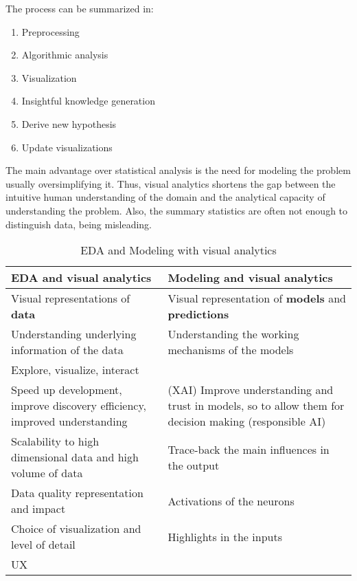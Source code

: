 \documentclass[a4paper]{report}
\begin{document}
The process can be summarized in:
\begin{enumerate}
    \item Preprocessing
    \item Algorithmic analysis
    \item Visualization
    \item Insightful knowledge generation
    \item Derive new hypothesis
    \item Update visualizations
\end{enumerate}

\begin{note}
    The main advantage over statistical analysis is the need for modeling the problem usually oversimplifying it. Thus, visual analytics shortens the gap between the intuitive human understanding of the domain and the analytical capacity of understanding the problem. Also, the summary statistics are often not enough to distinguish data, being misleading.
\end{note}

\begin{table}[H]
    \centering
    \caption{EDA and Modeling with visual analytics}
    \label{tab:eda-modeling}
    \begin{tabularx}{\textwidth}{X X}
    \toprule
    EDA and visual analytics & Modeling and visual analytics \\
    \midrule
    Visual representations of \textbf{data} & Visual representation of \textbf{models} and \textbf{predictions} \\
    Understanding underlying information of the data & Understanding the working mechanisms of the models \\
    Explore, visualize, interact & \\
    \midrule
    Speed up development, improve discovery efficiency, improved understanding & (XAI) Improve understanding and trust in models, so to allow them for decision making (responsible AI) \\
    \midrule
    Scalability to high dimensional data and high volume of data & Trace-back the main influences in the output \\
    Data quality representation and impact & Activations of the neurons \\
    Choice of visualization and level of detail & Highlights in the inputs \\
    UX & \\
    \bottomrule
    \end{tabularx}
\end{table}
\end{document}
